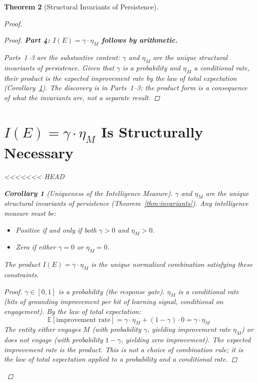 \documentclass[11pt]{article}
\newtheorem{theorem}{Theorem}
\newtheorem{corollary}[theorem]{Corollary}
\theoremstyle{definition}
\theoremstyle{remark}
\begin{document}
\begin{theorem}[Structural Invariants of Persistence]
\begin{proof}
\begin{proof}
\medskip
\textbf{Part 4: $I(E) = \gamma \cdot \eta_M$ follows by arithmetic.}

Parts~1--3 are the substantive content: $\gamma$ and $\eta_M$ are the
unique structural invariants of persistence. Given that $\gamma$ is a
probability and $\eta_M$ a conditional rate, their product is the
expected improvement rate by the law of total expectation
(Corollary~\ref{cor:measure}). The discovery is in Parts~1--3; the
product form is a consequence of what the invariants \emph{are}, not
a separate result.
\end{proof}

\section{$I(E) = \gamma \cdot \eta_M$ Is Structurally Necessary}
\label{sec:measure}

<<<<<<< HEAD
\begin{corollary}[Uniqueness of the Intelligence Measure]
\label{cor:measure}
$\gamma$ and $\eta_M$ are the unique structural invariants of persistence
(Theorem~\ref{thm:invariants}). Any intelligence measure must be:
\begin{itemize}
\item Positive if and only if both $\gamma > 0$ and $\eta_M > 0$.
\item Zero if either $\gamma = 0$ or $\eta_M = 0$.
\end{itemize}
The product $I(E) = \gamma \cdot \eta_M$ is the unique normalized
combination satisfying these constraints.
\end{corollary}

\begin{proof}
$\gamma \in [0, 1]$ is a probability (the response gate). $\eta_M$ is a
conditional rate (bits of grounding improvement per bit of learning
signal, conditional on engagement). By the law of total expectation:
\[
\mathbb{E}[\text{improvement rate}]
= \gamma \cdot \eta_M + (1 - \gamma) \cdot 0
= \gamma \cdot \eta_M
\]
The entity either engages $M$ (with probability $\gamma$, yielding
improvement rate $\eta_M$) or does not engage (with probability
$1 - \gamma$, yielding zero improvement). The expected improvement rate is
the product. This is not a choice of combination rule; it is the law
of total expectation applied to a probability and a conditional rate.


\end{proof}
\end{proof}
\end{theorem}
\end{document}

